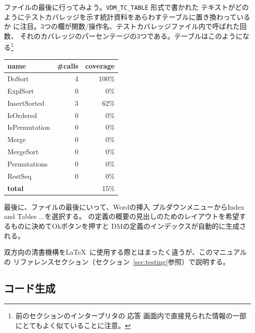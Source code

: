 \documentclass[\pformat,12pt]{jarticle}
\newcommand{\guicmd}[1]{{\gt #1}}
\begin{document}
ファイルの最後に行ってみよう。{\tt VDM\_TC\_TABLE} 形式で書かれた
テキストがどのようにテストカバレッジを示す統計資料をあらわすテーブルに置き換わっているか
に注目。3つの欄が関数/操作名、テストカバレッジファイル内で呼ばれた回数、
それのカバレッジのパーセンテージの3つである。テーブルはこのようになる\footnote{前のセクションのインタープリタの
\guicmd{応答} 画面内で直接見られた情報の一部にとてもよく似ていることに注意。} 

\begin{center}
\begin{tabular}{|l|r|r|}\hline
\textbf{name}   & \textbf{\#calls} & \textbf{coverage} \\ \hline
DoSort          & 4     & 100\% \\
ExplSort        & 0     & 0\%\\
InsertSorted    & 3     & 62\%\\
IsOrdered       & 0     & 0\%\\
IsPermutation   & 0     & 0\%\\
Merge           & 0     & 0\%\\
MergeSort       & 0     & 0\%\\
Permutations    & 0     & 0\%\\
RestSeq         & 0     & 0\%\\
\textbf{total}  &       & 15\%\\\hline
\end{tabular} 
\end{center}


最後に、ファイルの最後にいって、Wordの\guicmd{挿入} プルダウンメニューから\guicmd{Index
and Tables ...}を選択する。
の定義の概要の見出しのためのレイアウトを希望するものに決めて\guicmd{Ok}ボタンを押すと
DMの定義のインデックスが自動的に生成される。

双方向の清書機構を\LaTeX\ に使用する際とはまったく違うが、このマニュアルの
リファレンスセクション（セクション~\ref{sec:testing}参照）で説明する。

\subsection{コード生成}
\end{document}
